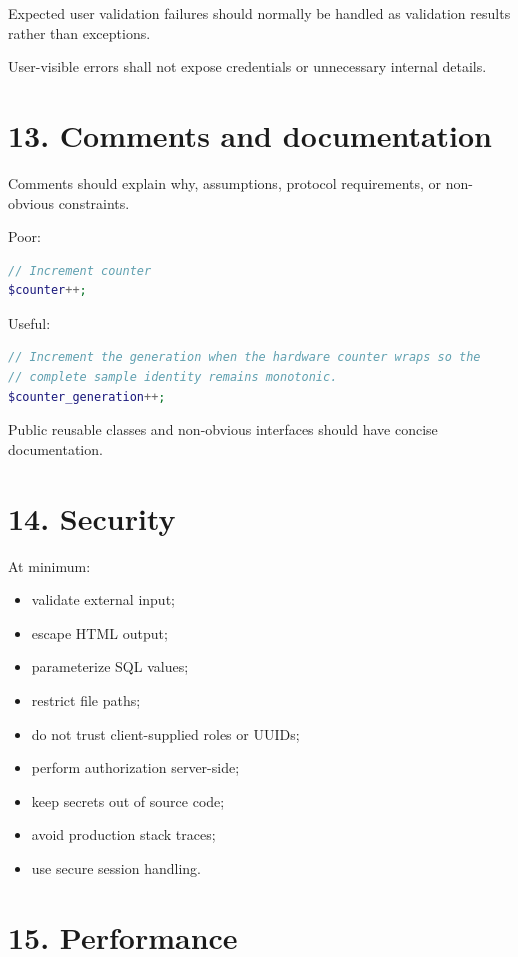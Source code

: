 \documentclass[11pt,a4paper]{article}
\begin{document}
Expected user validation failures should normally be handled as
validation results rather than exceptions.

User-visible errors shall not expose credentials or unnecessary internal
details.

\section{13. Comments and
documentation}\label{13-comments-and-documentation}

Comments should explain why, assumptions, protocol requirements, or
non-obvious constraints.

Poor:

\begin{lstlisting}[language=PHP]
// Increment counter
$counter++;
\end{lstlisting}

Useful:

\begin{lstlisting}[language=PHP]
// Increment the generation when the hardware counter wraps so the
// complete sample identity remains monotonic.
$counter_generation++;
\end{lstlisting}

Public reusable classes and non-obvious interfaces should have concise
documentation.

\section{14. Security}\label{14-security}

At minimum:

\begin{itemize}
\tightlist
\item
  validate external input;
\item
  escape HTML output;
\item
  parameterize SQL values;
\item
  restrict file paths;
\item
  do not trust client-supplied roles or UUIDs;
\item
  perform authorization server-side;
\item
  keep secrets out of source code;
\item
  avoid production stack traces;
\item
  use secure session handling.
\end{itemize}

\section{15. Performance}\label{15-performance}
\end{document}
